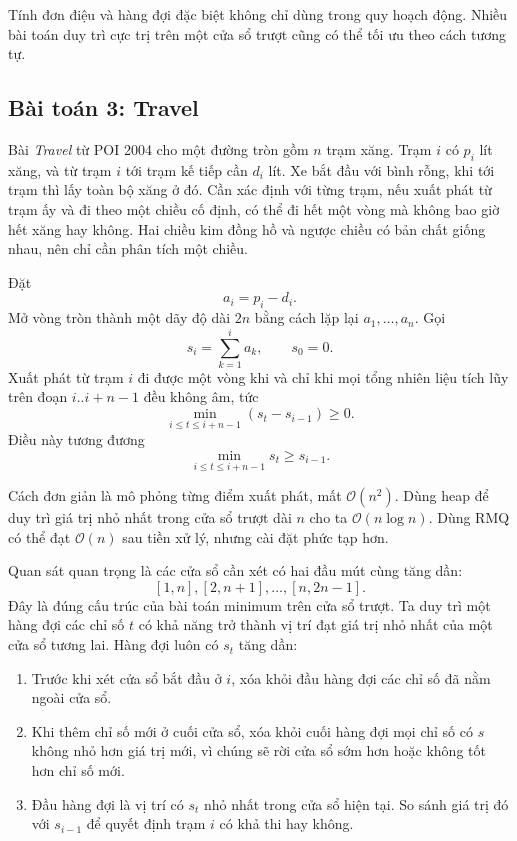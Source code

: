 \documentclass[11pt]{article}
\newcommand{\Oh}{\mathcal{O}}
\begin{document}
Tính đơn điệu và hàng đợi đặc biệt không chỉ dùng trong quy hoạch động. Nhiều
bài toán duy trì cực trị trên một cửa sổ trượt cũng có thể tối ưu theo cách
tương tự.

\subsection{Bài toán 3: Travel}

Bài \textit{Travel} từ POI 2004 cho một đường tròn gồm \(n\) trạm xăng. Trạm
\(i\) có \(p_i\) lít xăng, và từ trạm \(i\) tới trạm kế tiếp cần \(d_i\) lít.
Xe bắt đầu với bình rỗng, khi tới trạm thì lấy toàn bộ xăng ở đó. Cần xác định
với từng trạm, nếu xuất phát từ trạm ấy và đi theo một chiều cố định, có thể
đi hết một vòng mà không bao giờ hết xăng hay không. Hai chiều kim đồng hồ và
ngược chiều có bản chất giống nhau, nên chỉ cần phân tích một chiều.

Đặt
\[
  a_i=p_i-d_i.
\]
Mở vòng tròn thành một dãy độ dài \(2n\) bằng cách lặp lại \(a_1,\ldots,a_n\).
Gọi
\[
  s_i=\sum_{k=1}^{i}a_k,\qquad s_0=0.
\]
Xuất phát từ trạm \(i\) đi được một vòng khi và chỉ khi mọi tổng nhiên liệu
tích lũy trên đoạn \(i..i+n-1\) đều không âm, tức
\[
  \min_{i\le t\le i+n-1} (s_t-s_{i-1})\ge 0.
\]
Điều này tương đương
\[
  \min_{i\le t\le i+n-1} s_t\ge s_{i-1}.
\]

Cách đơn giản là mô phỏng từng điểm xuất phát, mất \(\Oh(n^2)\). Dùng heap để
duy trì giá trị nhỏ nhất trong cửa sổ trượt dài \(n\) cho ta
\(\Oh(n\log n)\). Dùng RMQ có thể đạt \(\Oh(n)\) sau tiền xử lý, nhưng cài đặt
phức tạp hơn.

Quan sát quan trọng là các cửa sổ cần xét có hai đầu mút cùng tăng dần:
\[
  [1,n], [2,n+1], \ldots, [n,2n-1].
\]
Đây là đúng cấu trúc của bài toán minimum trên cửa sổ trượt. Ta duy trì một
hàng đợi các chỉ số \(t\) có khả năng trở thành vị trí đạt giá trị nhỏ nhất
của một cửa sổ tương lai. Hàng đợi luôn có \(s_t\) tăng dần:
\begin{enumerate}
  \item Trước khi xét cửa sổ bắt đầu ở \(i\), xóa khỏi đầu hàng đợi các chỉ số
  đã nằm ngoài cửa sổ.
  \item Khi thêm chỉ số mới ở cuối cửa sổ, xóa khỏi cuối hàng đợi mọi chỉ số
  có \(s\) không nhỏ hơn giá trị mới, vì chúng sẽ rời cửa sổ sớm hơn hoặc
  không tốt hơn chỉ số mới.
  \item Đầu hàng đợi là vị trí có \(s_t\) nhỏ nhất trong cửa sổ hiện tại. So
  sánh giá trị đó với \(s_{i-1}\) để quyết định trạm \(i\) có khả thi hay
  không.
\end{enumerate}
\end{document}
